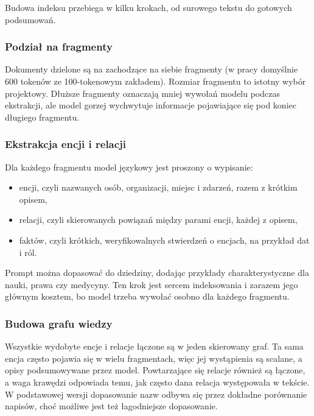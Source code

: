 \documentclass[11pt,a4paper]{article}
\begin{document}
Budowa indeksu przebiega w kilku krokach, od surowego tekstu do gotowych podsumowań.

\subsubsection{Podział na fragmenty}

Dokumenty dzielone są na zachodzące na siebie fragmenty (w pracy domyślnie 600 tokenów ze
100-tokenowym zakładem). Rozmiar fragmentu to istotny wybór projektowy. Dłuższe fragmenty
oznaczają mniej wywołań modelu podczas ekstrakcji, ale model gorzej wychwytuje informacje
pojawiające się pod koniec długiego fragmentu.

\subsubsection{Ekstrakcja encji i relacji}

Dla każdego fragmentu model językowy jest proszony o wypisanie:

\begin{itemize}[itemsep=2pt]
  \item encji, czyli nazwanych osób, organizacji, miejsc i zdarzeń, razem z krótkim opisem,
  \item relacji, czyli skierowanych powiązań między parami encji, każdej z opisem,
  \item faktów, czyli krótkich, weryfikowalnych stwierdzeń o encjach, na przykład dat i ról.
\end{itemize}

Prompt można dopasować do dziedziny, dodając przykłady charakterystyczne dla nauki, prawa
czy medycyny. Ten krok jest sercem indeksowania i zarazem jego głównym kosztem, bo model
trzeba wywołać osobno dla każdego fragmentu.

\subsubsection{Budowa grafu wiedzy}

Wszystkie wydobyte encje i relacje łączone są w jeden skierowany graf. Ta sama encja często
pojawia się w wielu fragmentach, więc jej wystąpienia są scalane, a opisy podsumowywane przez
model. Powtarzające się relacje również są łączone, a waga krawędzi odpowiada temu, jak
często dana relacja występowała w tekście. W podstawowej wersji dopasowanie nazw odbywa się
przez dokładne porównanie napisów, choć możliwe jest też łagodniejsze dopasowanie.
\end{document}
